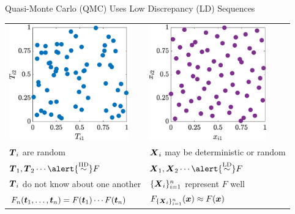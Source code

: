 \documentclass[11pt,compress,xcolor={usenames,dvipsnames},aspectratio=169]{beamer}
\begin{document}
\begin{frame}{Quasi-Monte Carlo (QMC) Uses Low Discrepancy (LD) Sequences}
\vspace{-3ex}
\begin{tabular}{>{\centering}p{}@{\quad}>{\centering}p{}}
\includegraphics[height=5cm]{ProgramsImages/IIDPoints.eps} &
\includegraphics[height=5cm]{ProgramsImages/SSobolPoints.eps}
\tabularnewline
$\boldsymbol{T}_i$ are random &
$\boldsymbol{X}_i$ may be deterministic or random 
\tabularnewline
$\vT_1, \vT_2 \cdots \alert{\IIDsim} F$ &
$\vX_1, \vX_2 \cdots \alert{\LDsim} F$ 
\tabularnewline
$\boldsymbol{T}_i$ do not know about one another &
$\{\boldsymbol{X}_i\}_{i=1}^n$ represent $F$ well
\tabularnewline
$F_{n}(\boldsymbol{t}_1, \ldots, \boldsymbol{t}_n) = F(\boldsymbol{t}_1) \cdots F(\boldsymbol{t}_n)$ &
$F_{\{\boldsymbol{X}_i\}_{i=1}^n}(\boldsymbol{x}) \approx F(\boldsymbol{x})$
\end{tabular}
\end{frame}
\end{document}
